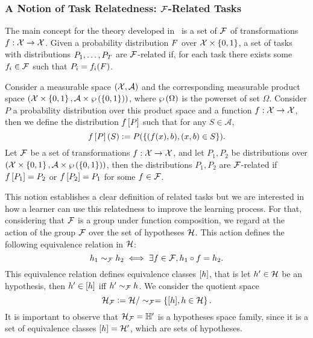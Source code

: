\subsubsection*{A Notion of Task Relatedness: $\mathcal{F}$-Related Tasks}
The main concept for the theory developed in~\cite{Ben-DavidB08} is a set of $\mathcal{F}$ of transformations $f: \mathcal{X} \to \mathcal{X}$. Given a probability distribution $F$ over $\mathcal{X} \times \left\{0, 1\right\}$, a set of tasks with distributions $P_1, \ldots, P_T$ are $\mathcal{F}$-related if, for each task there exists some $f_i \in \mathcal{F}$ such that $P_i = f_i(F)$.

\begin{definition}\label{def:frel_tasks}
    Consider a measurable space $(\mathcal{X}, \mathcal{A})$ and the corresponding measurable product space $(\mathcal{X} \times \left\{0, 1\right\}, \mathcal{A} \times \wp\left( \left\{0, 1\right\} \right))$, where $\wp\left( \Omega \right)$ is the powerset of set $\Omega$. Consider $P$ a probability distribution over this product space and a function $f: \mathcal{X} \to \mathcal{X}$, then we define the distribution $f\left[ P \right]$ such that for any $S \in \mathcal{A}$,
    $$ f\left[ P \right](S) \vcentcolon= P(\left\{(f(x), b), (x, b) \in S \right\}).$$
    Let $\mathcal{F}$ be a set of transformations $f: \mathcal{X} \to \mathcal{X}$, and let $P_1, P_2$ be distributions over $(\mathcal{X} \times \left\{0, 1\right\}, \mathcal{A} \times \wp\left( \left\{0, 1\right\} \right))$, then the distributions $P_1, P_2$ are $\mathcal{F}$-related if $f\left[ P_1 \right]= P_2$ or $f\left[ P_2 \right] = P_1$ for some $f \in \mathcal{F}$.
\end{definition}
This notion establishes a clear definition of related tasks but we are interested in how a learner can use this relatedness to improve the learning process.
For that, considering that $\mathcal{F}$ is a group under function composition, we regard at the action of the group $\mathcal{F}$ over the set of hypotheses $\mathcal{H}$. This action defines the following equivalence relation in $\mathcal{H}$:
$$ h_1 \sim_{\mathcal{F}} h_2 \iff \exists f \in \mathcal{F},  h_1 \circ f = h_2 .$$
%
This equivalence relation defines equivalence classes $\lbrack h\rbrack$, that is let $h' \in \mathcal{H}$ be an hypothesis, then $h' \in \lbrack h\rbrack$ iff $h' \sim_{\mathcal{F}} h$. 
We consider the quotient space 
$$\mathcal{H}_{\mathcal{F}} \vcentcolon= \mathcal{H} / \sim_{\mathcal{F}} = \left\{\lbrack h\rbrack, h \in \mathcal{H}\right\}.$$
It is important to observe that $\mathcal{H}_{\mathcal{F}} = \mathbb{H}'$ is a hypotheses space family, since it is a set of equivalence classes $\lbrack h\rbrack = \mathcal{H}'$, which are sets of hypotheses.
%

